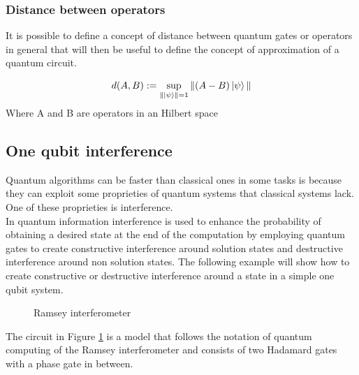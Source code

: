 \documentclass{article}
\begin{document}
\subsubsection{Distance between operators}
It is possible to define a concept of distance between quantum gates or operators
in general that will then be useful to define the concept of approximation of a
quantum circuit.

\begin{equation}
	d(A,B) := \sup_{\| \ket{\psi}\|=1} \|(A-B)\ket{\psi}\|
	\label{distance}
\end{equation}
Where A and B are operators in an Hilbert space

\subsection{One qubit interference}




Quantum algorithms can be faster than classical ones
in some tasks is because they can exploit some proprieties of quantum
systems that classical systems lack.
One of these proprieties is interference.\\
In quantum information interference is used to enhance the probability of
obtaining a desired state at the end of the computation by employing quantum gates
to create constructive interference around solution states and destructive
interference around non solution states.
The following example will show how to create constructive or destructive interference
around a state in a simple one qubit system.
\vspace{10pt}
\begin{figure}[H]
	\centering
	\caption{Ramsey interferometer}
	\label{interference}
\end{figure}
\vspace{10pt}
\noindent The circuit in Figure \ref{interference} is a model
that follows the notation of quantum computing of the Ramsey interferometer and consists of
two Hadamard gates with a phase gate in between.\\
\end{document}
